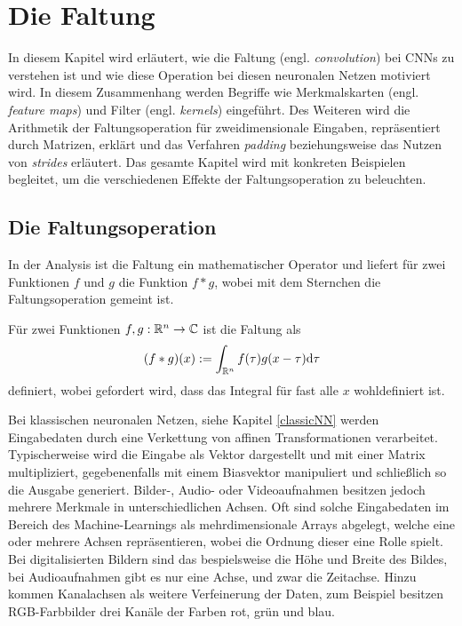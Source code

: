 \chapter{Die Faltung}
In diesem Kapitel wird erläutert, wie die Faltung (engl. \textit{convolution}) bei CNNs zu verstehen ist und wie diese Operation bei diesen neuronalen Netzen motiviert wird. In diesem Zusammenhang werden Begriffe wie Merkmalskarten (engl. \textit{feature maps}) und Filter (engl. \textit{kernels}) eingeführt. Des Weiteren wird die Arithmetik der Faltungsoperation für zweidimensionale Eingaben, repräsentiert durch Matrizen, erklärt und das Verfahren \textit{padding} beziehungsweise das Nutzen von \textit{strides} erläutert. Das gesamte Kapitel wird mit konkreten Beispielen begleitet, um die verschiedenen Effekte der Faltungsoperation zu beleuchten.

\section{Die Faltungsoperation}
In der Analysis ist die Faltung ein mathematischer Operator und liefert für zwei Funktionen $f$ und $g$ die Funktion $ f \ast g$, wobei mit dem Sternchen die Faltungsoperation gemeint ist.

\begin{defi}[Faltung]\label{allg_faltung}
    Für zwei Funktionen $f,g: \mathbb{R}^{n} \rightarrow \mathbb{C}$ ist die Faltung als
    \begin{equation*}
        (f \ast g) (x) := \int_{\mathbb{R}^{n}} f(\tau) g(x-\tau) \mathrm{d} \tau
    \end{equation*}
    definiert, wobei gefordert wird, dass das Integral für fast alle $x$ wohldefiniert ist.
   \end{defi}

Bei klassischen neuronalen Netzen, siehe Kapitel \ref{classicNN} werden Eingabedaten durch eine Verkettung von affinen Transformationen verarbeitet. Typischerweise wird die Eingabe als Vektor dargestellt und  mit einer Matrix multipliziert, gegebenenfalls mit einem Biasvektor manipuliert und schließlich so die Ausgabe generiert. Bilder-, Audio- oder Videoaufnahmen besitzen jedoch mehrere Merkmale in unterschiedlichen Achsen. Oft sind solche Eingabedaten im Bereich des Machine-Learnings als mehrdimensionale Arrays abgelegt, welche eine oder mehrere Achsen repräsentieren, wobei die Ordnung dieser eine Rolle spielt. Bei digitalisierten Bildern sind das bespielsweise die Höhe und Breite des Bildes, bei Audioaufnahmen gibt es nur eine Achse, und zwar die Zeitachse. Hinzu kommen Kanalachsen als weitere Verfeinerung der Daten, zum Beispiel besitzen RGB-Farbbilder drei Kanäle der Farben rot, grün und blau. 

